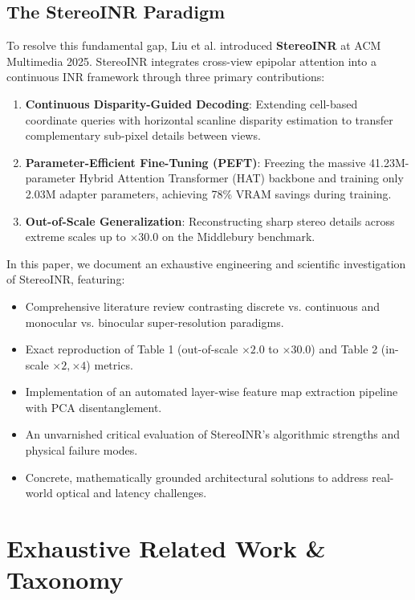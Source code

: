 \documentclass[10pt,journal,compsoc]{IEEEtran}
\begin{document}
\subsection{The StereoINR Paradigm}
To resolve this fundamental gap, Liu et al. introduced \textbf{StereoINR} \cite{liu2025stereoinr} at ACM Multimedia 2025. StereoINR integrates cross-view epipolar attention into a continuous INR framework through three primary contributions:
\begin{enumerate}
    \item \textbf{Continuous Disparity-Guided Decoding}: Extending cell-based coordinate queries with horizontal scanline disparity estimation to transfer complementary sub-pixel details between views.
    \item \textbf{Parameter-Efficient Fine-Tuning (PEFT)}: Freezing the massive 41.23M-parameter Hybrid Attention Transformer (HAT) backbone and training only 2.03M adapter parameters, achieving 78\% VRAM savings during training.
    \item \textbf{Out-of-Scale Generalization}: Reconstructing sharp stereo details across extreme scales up to $\times 30.0$ on the Middlebury benchmark.
\end{enumerate}

In this paper, we document an exhaustive engineering and scientific investigation of StereoINR, featuring:
\begin{itemize}
    \item Comprehensive literature review contrasting discrete vs. continuous and monocular vs. binocular super-resolution paradigms.
    \item Exact reproduction of Table 1 (out-of-scale $\times 2.0$ to $\times 30.0$) and Table 2 (in-scale $\times 2, \times 4$) metrics.
    \item Implementation of an automated layer-wise feature map extraction pipeline with PCA disentanglement.
    \item An unvarnished critical evaluation of StereoINR's algorithmic strengths and physical failure modes.
    \item Concrete, mathematically grounded architectural solutions to address real-world optical and latency challenges.
\end{itemize}

\section{Exhaustive Related Work \& Taxonomy}
\end{document}
